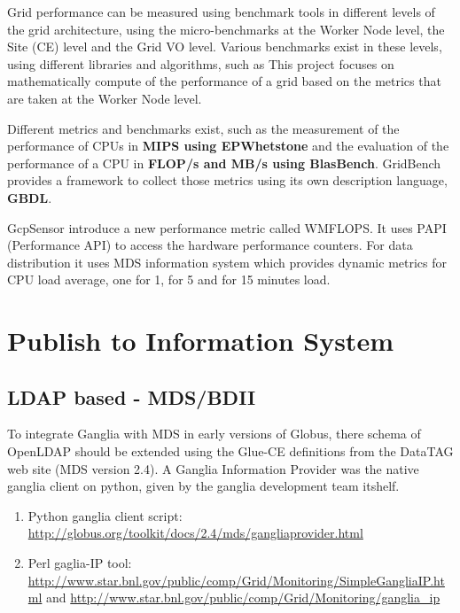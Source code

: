 Grid performance can be measured using benchmark tools in different levels of the grid architecture, using the micro-benchmarks at the Worker Node level, the Site (CE) level and the Grid VO level. Various benchmarks exist in these levels, using different libraries and algorithms, such as This project focuses on mathematically compute of the performance of a grid based on the metrics that are taken at the Worker Node level.

Different metrics and benchmarks exist, such as the measurement of the performance of CPUs in {\bf MIPS using EPWhetstone} and the evaluation of the performance of a CPU in {\bf FLOP/s and MB/s using BlasBench}. GridBench \cite{gridbench} provides a framework to collect those metrics using its own description language, {\bf GBDL}.

GcpSensor \cite{gcpsensor} introduce a new performance metric called WMFLOPS. It uses PAPI \cite{papi} (Performance API) to access the hardware performance counters. For data distribution it uses MDS information system which provides dynamic metrics for CPU load average, one for 1, for 5 and for 15 minutes load.
\newpage

\section{Publish to Information System}
\cite{goelagent}

\subsection{LDAP based - MDS/BDII}
To integrate Ganglia with MDS in early versions of Globus, there schema of OpenLDAP should be extended using the Glue-CE definitions from the DataTAG web site (MDS version 2.4). A Ganglia Information Provider was the native ganglia client on python, given by the ganglia development team itshelf.
\begin{enumerate}
  \item Python ganglia client script: \url{http://globus.org/toolkit/docs/2.4/mds/gangliaprovider.html}
  \item Perl gaglia-IP tool: \url{http://www.star.bnl.gov/public/comp/Grid/Monitoring/SimpleGangliaIP.html} and \url{http://www.star.bnl.gov/public/comp/Grid/Monitoring/ganglia\_ip}
\end{enumerate}

